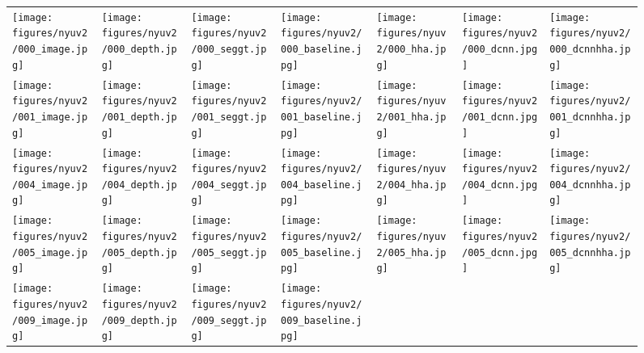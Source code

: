 \begin{figure}
	\centering
{}
	\begin{tabular}{CCCCCCC}
		\texttt{[image: figures/nyuv2/000\_image.jpg]}
		&\texttt{[image: figures/nyuv2/000\_depth.jpg]}
		&\texttt{[image: figures/nyuv2/000\_seggt.jpg]}
		&\texttt{[image: figures/nyuv2/000\_baseline.jpg]}
		&\texttt{[image: figures/nyuv2/000\_hha.jpg]}
		&\texttt{[image: figures/nyuv2/000\_dcnn.jpg]}
		&\texttt{[image: figures/nyuv2/000\_dcnnhha.jpg]}
		\\
		\texttt{[image: figures/nyuv2/001\_image.jpg]}
		&\texttt{[image: figures/nyuv2/001\_depth.jpg]}
		&\texttt{[image: figures/nyuv2/001\_seggt.jpg]}
		&\texttt{[image: figures/nyuv2/001\_baseline.jpg]}
		&\texttt{[image: figures/nyuv2/001\_hha.jpg]}
		&\texttt{[image: figures/nyuv2/001\_dcnn.jpg]}
		&\texttt{[image: figures/nyuv2/001\_dcnnhha.jpg]}
		\\
		\texttt{[image: figures/nyuv2/004\_image.jpg]}
		&\texttt{[image: figures/nyuv2/004\_depth.jpg]}
		&\texttt{[image: figures/nyuv2/004\_seggt.jpg]}
		&\texttt{[image: figures/nyuv2/004\_baseline.jpg]}
		&\texttt{[image: figures/nyuv2/004\_hha.jpg]}
		&\texttt{[image: figures/nyuv2/004\_dcnn.jpg]}
		&\texttt{[image: figures/nyuv2/004\_dcnnhha.jpg]}
		\\
		\texttt{[image: figures/nyuv2/005\_image.jpg]}
		&\texttt{[image: figures/nyuv2/005\_depth.jpg]}
		&\texttt{[image: figures/nyuv2/005\_seggt.jpg]}
		&\texttt{[image: figures/nyuv2/005\_baseline.jpg]}
		&\texttt{[image: figures/nyuv2/005\_hha.jpg]}
		&\texttt{[image: figures/nyuv2/005\_dcnn.jpg]}
		&\texttt{[image: figures/nyuv2/005\_dcnnhha.jpg]}
		\\
		\texttt{[image: figures/nyuv2/009\_image.jpg]}
		&\texttt{[image: figures/nyuv2/009\_depth.jpg]}
		&\texttt{[image: figures/nyuv2/009\_seggt.jpg]}
		&\texttt{[image: figures/nyuv2/009\_baseline.jpg]}

\end{tabular}
\end{figure}
